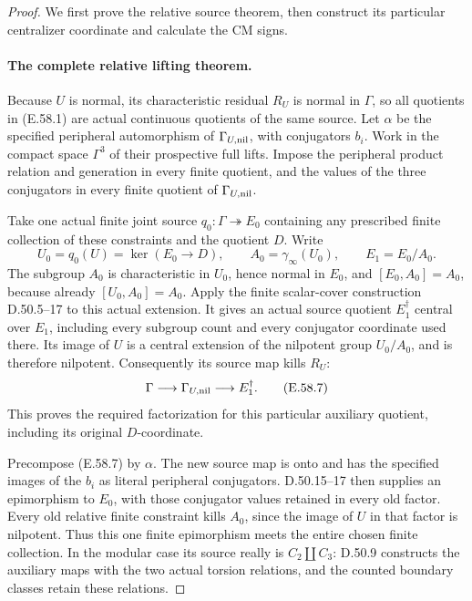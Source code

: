 \begin{proof}
We first prove the relative source theorem, then construct its
particular centralizer coordinate and calculate the CM signs.

\paragraph{The complete relative lifting theorem.}
Because \(U\) is normal, its characteristic residual \(R_U\)
is normal in \(\Gamma\), so all quotients in
\textup{(E.58.1)} are actual continuous quotients of the same source.
Let \(\alpha\) be the specified peripheral automorphism of
\(\Gamma_{U,\rm nil}\), with conjugators \(b_i\).
Work in the compact space \(\Gamma^3\) of their prospective
full lifts. Impose the peripheral product relation and generation
in every finite quotient, and the values of the three conjugators
in every finite quotient of \(\Gamma_{U,\rm nil}\).

Take one actual finite joint source
\(q_0:\Gamma\twoheadrightarrow E_0\) containing any prescribed
finite collection of these constraints and the quotient \(D\).
Write
\[
 U_0=q_0(U)=\ker(E_0\to D),\qquad
 A_0=\gamma_\infty(U_0),\qquad E_1=E_0/A_0.
 \tag{E.58.6}
\]
The subgroup \(A_0\) is characteristic in \(U_0\), hence normal
in \(E_0\), and
\([E_0,A_0]=A_0\), because already \([U_0,A_0]=A_0\).
Apply the finite scalar-cover construction D.50.5--17 to this
actual extension. It gives an actual source quotient
\(E_1^\dagger\) central over \(E_1\), including every subgroup
count and every conjugator coordinate used there.
Its image of \(U\) is a central extension of the nilpotent group
\(U_0/A_0\), and is therefore nilpotent. Consequently its source
map kills \(R_U\):
\[
 \Gamma\longrightarrow\Gamma_{U,\rm nil}
                  \longrightarrow E_1^\dagger.
 \tag{E.58.7}
\]
This proves the required factorization for this particular
auxiliary quotient, including its original \(D\)-coordinate.

Precompose \textup{(E.58.7)} by \(\alpha\). The new source map
is onto and has the specified images of the \(b_i\) as literal
peripheral conjugators. D.50.15--17 then supplies an epimorphism
to \(E_0\), with those conjugator values retained in every old
factor. Every old relative finite constraint kills \(A_0\),
since the image of \(U\) in that factor is nilpotent.
Thus this one finite epimorphism meets the entire chosen finite
collection. In the modular case its source really is
\(C_2\amalg C_3\): D.50.9 constructs the auxiliary maps with
the two actual torsion relations, and the counted boundary
classes retain these relations.


\end{proof}

